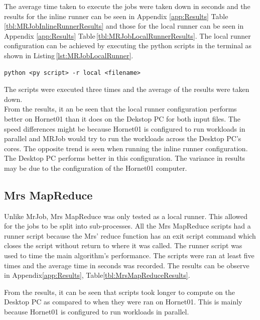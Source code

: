 \documentclass[10pt, twocolumn]{article}
\begin{document}
\noindent The average time taken to execute the jobs were taken down in seconds and the results for the inline runner can be seen in Appendix \ref*{app:Results} Table\,\ref{tbl:MRJobInlineRunnerResults} and those for the local runner can be seen in Appendix \ref*{app:Results} Table\,\ref{tbl:MRJobLocalRunnerResults}. The local runner configuration can be achieved by executing the python scripts in the terminal as shown in Listing\,\ref*{lst:MRJobLocalRunner}. 
\begin{center}
\begin{minipage}{0.95\columnwidth}
\begin{lstlisting}[style=bashStyle, label=lst:MRJobLocalRunner, caption = Command to execute MRJob python script in Local runner configuration]
python <py script> -r local <filename>
\end{lstlisting}
\end{minipage}
\end{center}
\noindent The scripts were executed three times and the average of the results were taken down.\\

 \noindent From the results, it an be seen that the local runner configuration performs better on Hornet01 than it does on the Dekstop PC for both input files. The speed differences might be because Hornet01 is configured to run workloads in parallel and MRJob would try to run the workloads across the Desktop PC's cores. The opposite trend is seen when running the inline runner configuration. The Desktop PC performs better in this configuration. The variance in results may be due to the configuration of the Hornet01 computer.
\subsection{Mrs MapReduce}
%
Unlike MrJob, Mrs MapReduce was only tested as a local runner. This allowed for the jobs to be split into sub-processes. All the Mrs MapReduce scripts had a runner script because the Mrs' reduce function has an exit script command which closes the script without return to where it was called. The runner script was used to time the main algorithm's performance. The scripts were ran at least five times and the average time in seconds was recorded. The results can be observe in Appendix\;\;\ref*{app:Results}, Table\;\;\ref{tbl:MrsMapReduceResults}.

From the results, it can be seen that scripts took longer to compute on the Desktop PC as compared to when they were ran on Hornet01. This is mainly because Hornet01 is configured to run workloads in parallel.
%
\end{document}
